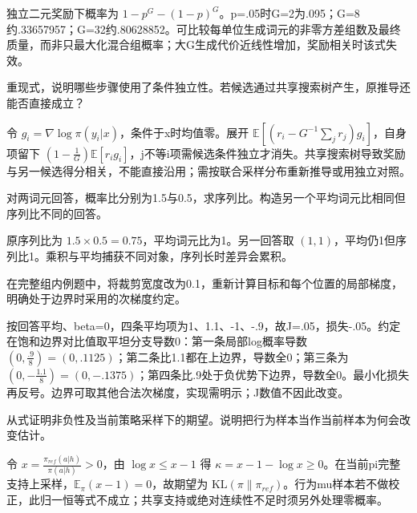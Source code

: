 \begin{exercises}
\begin{exercise}
\begin{solution}
独立二元奖励下概率为 $1-p^G-(1-p)^G$。p=.05时G=2为.095；G=8约.33657957；G=32约.80628852。可比较每单位生成词元的非零方差组数及最终质量，而非只最大化混合组概率；大G生成代价近线性增加，奖励相关时该式失效。
\end{solution}
\end{exercise}

\begin{exercise} 重现式，说明哪些步骤使用了条件独立性。若候选通过共享搜索树产生，原推导还能否直接成立？

\begin{solution}
令 $g_i=\nabla\log\pi(y_i|x)$，条件于x时均值零。展开 $\mathbb E[(r_i-G^{-1}\sum_jr_j)g_i]$，自身项留下 $(1-\frac{1}{G})\mathbb E[r_ig_i]$，j不等i项需候选条件独立才消失。共享搜索树导致奖励与另一候选得分相关，不能直接沿用；需按联合采样分布重新推导或用独立对照。
\end{solution}
\end{exercise}

\begin{exercise} 对两词元回答，概率比分别为1.5与0.5，求序列比。构造另一个平均词元比相同但序列比不同的回答。

\begin{solution}
原序列比为 $1.5\times0.5=0.75$，平均词元比为1。另一回答取 $(1,1)$，平均仍1但序列比1。乘积与平均捕获不同对象，序列长时差异会累积。
\end{solution}
\end{exercise}

\begin{exercise} 在完整组内例题中，将裁剪宽度改为0.1，重新计算目标和每个位置的局部梯度，明确处于边界时采用的次梯度约定。

\begin{solution}
按回答平均、beta=0，四条平均项为1、1.1、-1、-.9，故J=.05，损失-.05。约定在饱和边界对比值取平坦分支导数0：第一条局部log概率导数 $(0,\frac{.9}{8})=(0,.1125)$；第二条比1.1都在上边界，导数全0；第三条为 $(0,-\frac{1.1}{8})=(0,-.1375)$；第四条比.9处于负优势下边界，导数全0。最小化损失再反号。边界可取其他合法次梯度，实现需明示；J数值不因此改变。
\end{solution}
\end{exercise}

\begin{exercise} 从式证明非负性及当前策略采样下的期望。说明把行为样本当作当前样本为何会改变估计。

\begin{solution}
令 $x=\frac{\pi_{ref}(a|h)}{\pi(a|h)}>0$，由 $\log x\le x-1$ 得 $\kappa=x-1-\log x\ge0$。在当前pi完整支持上采样，$\mathbb E_\pi(x-1)=0$，故期望为 $\mathrm{KL}(\pi\|\pi_{ref})$。行为mu样本若不做校正，此归一恒等式不成立；共享支持或绝对连续性不足时须另外处理零概率。
\end{solution}
\end{exercise}


\end{exercises}
